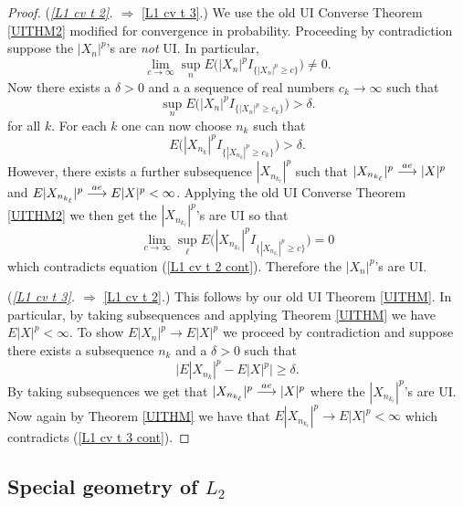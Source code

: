 \begin{proof}
({\sl \ref{L1 cv t 2}. $\Longrightarrow$} \ref{L1 cv t 3}.)
We use the old UI Converse Theorem \ref{UITHM2} modified for convergence in probability. Proceeding by contradiction suppose the $|X_{n}|^p$'s are {\it not} UI. In particular,
\[
\lim_{c\rightarrow \infty} \sup_n E\bigl(|X_{n}|^pI_{\{|X_{n}|^p\geq c\}}\bigr) \neq 0.
\]
Now there exists a $\delta>0$ and a  a sequence of real numbers $c_k\rightarrow \infty$ such that
\[
 \sup_n E\bigl(|X_{n}|^pI_{\{|X_{n}|^p\geq c_k\}}\bigr) >\delta.
\]
for all $k$. For each $k$ one can now choose $n_k$ such that
\begin{equation}
\label{L1 cv t 2 cont}
E\bigl(|X_{n_k}|^pI_{\{|X_{n_k}|^p\geq c_k\}}\bigr) >\delta.
\end{equation}
However, there exists a further subsequence $|X_{n_{k_\ell}}|^p$ such that  $|X_{n_{k_\ell}}|^p\overset{\small ae} \longrightarrow |X|^p$ and  $E|X_{n_{k_\ell}}|^p\overset{\small ae} \longrightarrow E|X|^p<\infty$. Applying the old UI Converse Theorem \ref{UITHM2} we then get the $|X_{n_{k_\ell}}|^p$'s are UI so that
\[
\lim_{c\rightarrow \infty} \sup_\ell E\bigl(|X_{n_{k_\ell}}|^pI_{\{|X_{n_{k_\ell}}|^p\geq c\}}\bigr) = 0
\]
which contradicts equation (\ref{L1 cv t 2 cont}). Therefore the $|X_{n}|^p$'s are UI.



({\sl \ref{L1 cv t 3}. $\Longrightarrow$} \ref{L1 cv t 2}.)
This follows by our old UI Theorem \ref{UITHM}. In particular, by taking subsequences and applying  Theorem  \ref{UITHM} we have $E|X|^p<\infty$. To show $E|X_{n}|^p\rightarrow E|X|^p$ we proceed by contradiction and suppose there exists a subsequence $n_k$ and a $\delta>0$ such that
\begin{equation}
\label{L1 cv t 3 cont}
\bigl|E|X_{n_k}|^p - E|X|^p\bigr|\geq \delta.
\end{equation}
By taking subsequences we get that $|X_{n_{k_\ell}}|^p\overset{\small ae} \longrightarrow |X|^p$ where the $|X_{n_{k_\ell}}|^p$'s are UI. Now again by Theorem \ref{UITHM} we have that
 $E|X_{n_{k_\ell}}|^p\rightarrow E|X|^p<\infty$ which contradicts (\ref{L1 cv t 3 cont}).



\end{proof}




%
%
\subsection{Special geometry of $L_2$}


